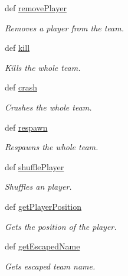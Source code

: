\begin{DoxyCompactItemize}
def \hyperlink{class_team_1_1_team_ae6bc66a477beb86618bbab0929828c84}{removePlayer}
\begin{DoxyCompactList}\small\item\em Removes a player from the team. \item\end{DoxyCompactList}\item 
def \hyperlink{class_team_1_1_team_af5fe65b108c2d90b9e885d52f043617e}{kill}
\begin{DoxyCompactList}\small\item\em Kills the whole team. \item\end{DoxyCompactList}\item 
def \hyperlink{class_team_1_1_team_adc372386d199ea4c5a3af9a2ab54501a}{crash}
\begin{DoxyCompactList}\small\item\em Crashes the whole team. \item\end{DoxyCompactList}\item 
def \hyperlink{class_team_1_1_team_a021ed714ff5abe3b6d60e89ac0009ddb}{respawn}
\begin{DoxyCompactList}\small\item\em Respawns the whole team. \item\end{DoxyCompactList}\item 
def \hyperlink{class_team_1_1_team_aabd4ec15a02677c903e5939707fc5ff8}{shufflePlayer}
\begin{DoxyCompactList}\small\item\em Shuffles an player. \item\end{DoxyCompactList}\item 
def \hyperlink{class_team_1_1_team_abc46169ec9af1703f524862128ab5fc7}{getPlayerPosition}
\begin{DoxyCompactList}\small\item\em Gets the position of the player. \item\end{DoxyCompactList}\item 
def \hyperlink{class_team_1_1_team_ad8d07f1b1cda805c9650e066bfce9a45}{getEscapedName}
\begin{DoxyCompactList}\small\item\em Gets escaped team name. \item\end{DoxyCompactList}\item 

\end{DoxyCompactItemize}
